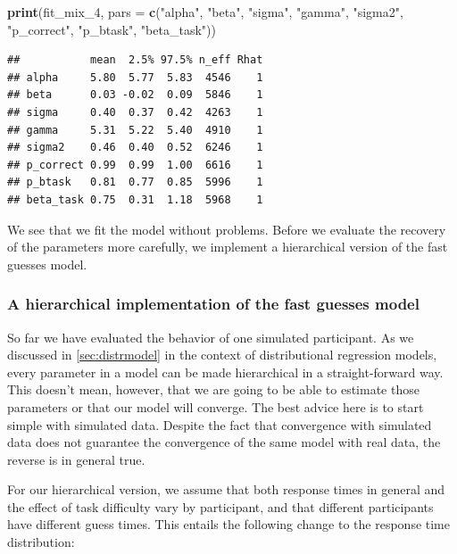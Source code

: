 \documentclass[12pt,]{krantz}
\newenvironment{Shaded}{\begin{snugshade}}{\end{snugshade}}
\newcommand{\DataTypeTok}[1]{\textcolor[rgb]{0.13,0.29,0.53}{#1}}
\newcommand{\DecValTok}[1]{\textcolor[rgb]{0.00,0.00,0.81}{#1}}
\newcommand{\KeywordTok}[1]{\textcolor[rgb]{0.13,0.29,0.53}{\textbf{#1}}}
\newcommand{\NormalTok}[1]{#1}
\newcommand{\StringTok}[1]{\textcolor[rgb]{0.31,0.60,0.02}{#1}}
\theoremstyle{definition}
\theoremstyle{definition}
\theoremstyle{definition}
\theoremstyle{remark}
\begin{document}
\begin{Shaded}
\begin{Highlighting}[]
\KeywordTok{print}\NormalTok{(fit_mix_}\DecValTok{4}\NormalTok{,}
      \DataTypeTok{pars =} \KeywordTok{c}\NormalTok{(}\StringTok{"alpha"}\NormalTok{, }\StringTok{"beta"}\NormalTok{, }\StringTok{"sigma"}\NormalTok{, }\StringTok{"gamma"}\NormalTok{, }\StringTok{"sigma2"}\NormalTok{,}
               \StringTok{"p_correct"}\NormalTok{, }\StringTok{"p_btask"}\NormalTok{, }\StringTok{"beta_task"}\NormalTok{))}
\end{Highlighting}
\end{Shaded}

\begin{verbatim}
##           mean  2.5% 97.5% n_eff Rhat
## alpha     5.80  5.77  5.83  4546    1
## beta      0.03 -0.02  0.09  5846    1
## sigma     0.40  0.37  0.42  4263    1
## gamma     5.31  5.22  5.40  4910    1
## sigma2    0.46  0.40  0.52  6246    1
## p_correct 0.99  0.99  1.00  6616    1
## p_btask   0.81  0.77  0.85  5996    1
## beta_task 0.75  0.31  1.18  5968    1
\end{verbatim}

We see that we fit the model without problems. Before we evaluate the recovery of the parameters more carefully, we implement a hierarchical version of the fast guesses model.

\hypertarget{a-hierarchical-implementation-of-the-fast-guesses-model}{%
\subsubsection{A hierarchical implementation of the fast guesses model}\label{a-hierarchical-implementation-of-the-fast-guesses-model}}

So far we have evaluated the behavior of one simulated participant.
As we discussed in \ref{sec:distrmodel} in the context of distributional regression models, every parameter in a model can be made hierarchical in a straight-forward way. This doesn't mean, however, that we are going to be able to estimate those parameters or that our model will converge. The best advice here is to start simple with simulated data. Despite the fact that convergence with simulated data does not guarantee the convergence of the same model with real data, the reverse is in general true.

For our hierarchical version, we assume that both response times in general and the effect of task difficulty vary by participant, and that different participants have different guess times. This entails the following change to the response time distribution:
\end{document}

